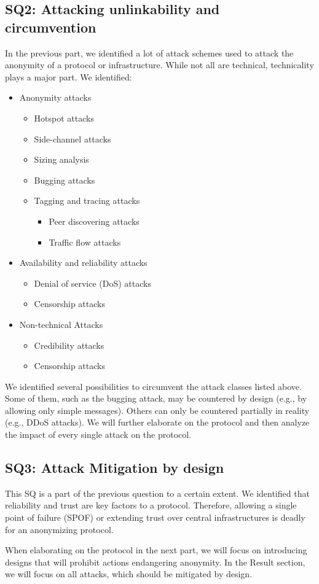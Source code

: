 \subsection{SQ2: Attacking unlinkability and circumvention}
In the previous part, we identified a lot of attack schemes used to attack the anonymity of a protocol or infrastructure. While not all are technical, technicality plays a major part. We identified:
\begin{itemize}
	\item Anonymity attacks
	\begin{itemize}
		\item Hotspot attacks
		\item Side-channel attacks
		\item Sizing analysis
		\item Bugging attacks
		\item Tagging and tracing attacks
		\begin{itemize}
			\item Peer discovering attacks
			\item Traffic flow attacks
		\end{itemize}
	\end{itemize}
	\item Availability and reliability attacks
	\begin{itemize}
		\item Denial of service (DoS) attacks
		\item Censorship attacks
	\end{itemize}
	\item Non-technical Attacks
	\begin{itemize}
		\item Credibility attacks
		\item Censorship attacks
	\end{itemize}
\end{itemize}

We identified several possibilities to circumvent the attack classes listed above. Some of them, such as the bugging attack, may be countered by design (e.g., by allowing only simple messages). Others can only be countered partially in reality (e.g., DDoS attacks). We will further elaborate on the protocol and then analyze the impact of every single attack on the protocol.

\subsection{SQ3: Attack Mitigation by design}
This SQ is a part of the previous question to a certain extent. We identified that reliability and trust are key factors to a protocol. Therefore, allowing a single point of failure (SPOF) or extending trust over central infrastructures is deadly for an anonymizing protocol. 

When elaborating on the protocol in the next part, we will focus on introducing designs that will prohibit actions endangering anonymity. In the Result section, we will focus on all attacks, which should be mitigated by design. 
